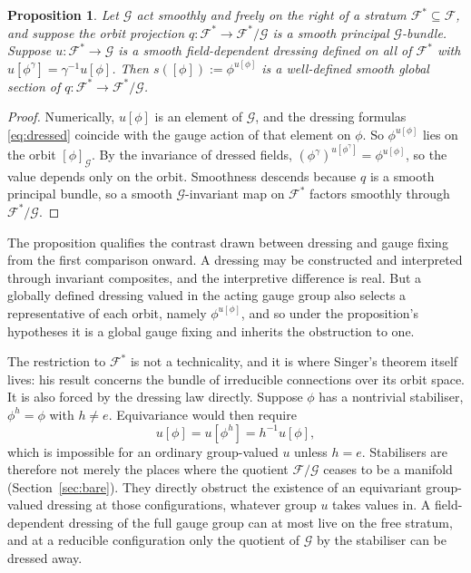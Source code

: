 \documentclass[11pt]{article}
\theoremstyle{plain}
\newtheorem{proposition}{Proposition}
\theoremstyle{definition}
\theoremstyle{remark}
\newcommand{\F}{\mathcal F}
\newcommand{\G}{\mathcal G}
\begin{document}
\begin{proposition}\label{prop:singer}
Let $\G$ act smoothly and freely on the right of a stratum $\F^*\subseteq\F$, and suppose the orbit projection $q:\F^*\to\F^*/\G$ is a smooth principal $\G$-bundle. Suppose $u:\F^*\to\G$ is a smooth field-dependent dressing defined on all of $\F^*$ with $u[\phi^\gamma]=\gamma^{-1}u[\phi]$. Then $s([\phi]):=\phi^{u[\phi]}$ is a well-defined smooth global section of $q:\F^*\to\F^*/\G$.
\end{proposition}

\begin{proof}
Numerically, $u[\phi]$ is an element of $\G$, and the dressing formulas \eqref{eq:dressed} coincide with the gauge action of that element on $\phi$. So $\phi^{u[\phi]}$ lies on the orbit $[\phi]_\G$. By the invariance of dressed fields, $(\phi^\gamma)^{u[\phi^\gamma]}=\phi^{u[\phi]}$, so the value depends only on the orbit. Smoothness descends because $q$ is a smooth principal bundle, so a smooth $\G$-invariant map on $\F^*$ factors smoothly through $\F^*/\G$.
\end{proof}

The proposition qualifies the contrast drawn between dressing and gauge fixing from the first comparison onward. A dressing may be constructed and interpreted through invariant composites, and the interpretive difference is real. But a globally defined dressing valued in the acting gauge group also selects a representative of each orbit, namely $\phi^{u[\phi]}$, and so under the proposition's hypotheses it is a global gauge fixing and inherits the obstruction to one.

The restriction to $\F^*$ is not a technicality, and it is where Singer's theorem itself lives: his result concerns the bundle of irreducible connections over its orbit space. It is also forced by the dressing law directly. Suppose $\phi$ has a nontrivial stabiliser, $\phi^h=\phi$ with $h\neq e$. Equivariance would then require
\begin{equation}\label{eq:stabobstruct}
u[\phi]=u[\phi^h]=h^{-1}u[\phi],
\end{equation}
which is impossible for an ordinary group-valued $u$ unless $h=e$. Stabilisers are therefore not merely the places where the quotient $\F/\G$ ceases to be a manifold (Section~\ref{sec:bare}). They directly obstruct the existence of an equivariant group-valued dressing at those configurations, whatever group $u$ takes values in. A field-dependent dressing of the full gauge group can at most live on the free stratum, and at a reducible configuration only the quotient of $\G$ by the stabiliser can be dressed away.
\end{document}
